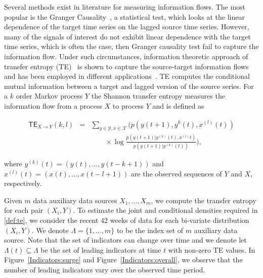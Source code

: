 \documentclass[conference,compsoc]{IEEEtran}
\begin{document}
Several methods exist in literature for measuring information flows. The most popular is the Granger Causality~\cite{granger1969investigating}, a statistical test, which looks at the linear dependence of the target time series on the lagged source time series. However, many of the signals of interest do not exhibit linear dependence with the target time series, which is often the case, then Granger causality test fail to capture the information flow. Under such circumstances, information theoretic approach of transfer entropy (TE)~\cite{schreiber2000measuring,bossomaier2016transfer} is shown to capture the source-target information flows and has been employed in different applications~\cite{marschinski2002analysing,vicente2011transfer}. 
TE computes the conditional mutual information between a target and lagged version of the source series. For a $k$ order Markov process $Y$  the  Shannon transfer entropy measures the information flow from a process $X$ to process $Y$ and is defined as

{\small
\begin{eqnarray}
    \mathsf{TE}_{X\to Y} (k, l) 
    &= &\sum_{y\in\mathcal{Y},x\in\mathcal{X}} \bigg( p\left(y(t+1),y^{k}(t),x^{(l)}(t) \right) \nonumber \\ 
    & &\qquad \times \log\frac{p(y(t+1)|y^{(k)}(t), x^{(l)} t ) }{p\left(y(t+1)|y^{(k)}(t)\right)}\bigg), \label{def:te}
\end{eqnarray}}

where $y^{(k)}(t) = (y(t), \dots, y(t-k+1))$ and $x^{(l)}(t) = (x(t), \dots, x(t-l+1))$ are the observed sequences of $Y$ and $X$, respectively.

Given $m$ data auxiliary data sources $X_1, \dots, X_m$, we compute the transfer entropy for each pair $(X_i, Y)$. To estimate the joint and conditional densities required in \eqref{def:te}, we consider the recent 42 weeks of data for each bi-variate distribution $(X_i, Y)$. We denote $\Lambda = \{1, \dots, m\}$ to be the index set of $m$ auxiliary data source. Note that the set of indicators can change over time and we denote let $\Lambda(t) \subseteq \Lambda$ be the set of leading indicators at time $t$ with non-zero TE values. In Figure~\ref{Indicators:surge} and Figure~\ref{Indicators:overall}, we observe that the number of leading indicators vary over the observed time period.
\end{document}
